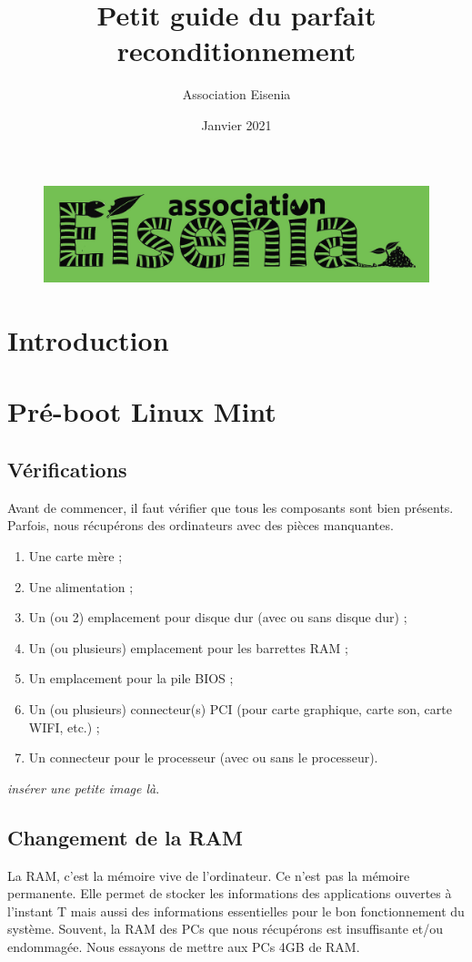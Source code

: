 \documentclass[12pt]{article}
\title{Petit guide du parfait reconditionnement}
\author{Association Eisenia}
\date{Janvier 2021}
\begin{document}
\maketitle
\begin{figure}
\centering\includegraphics[scale=0.5]{include/logo.jpg}
\end{figure}

\newpage
\renewcommand{\contentsname}{Table des matières}
\tableofcontents

\newpage
\section{Introduction}

\section{Pré-boot Linux Mint}
    \subsection{Vérifications}
        Avant de commencer, il faut vérifier que tous les composants sont bien présents.
        Parfois, nous récupérons des ordinateurs avec des pièces manquantes.
        \begin{enumerate}
            \item Une carte mère ;
            \item Une alimentation ;
            \item Un (ou 2) emplacement pour disque dur (avec ou sans disque dur) ;
            \item Un (ou plusieurs) emplacement pour les barrettes RAM ;
            \item Un emplacement pour la pile BIOS ;
            \item Un (ou plusieurs) connecteur(s) PCI (pour carte graphique, carte son, carte WIFI, etc.) ;
            \item Un connecteur pour le processeur (avec ou sans le processeur).
        \end{enumerate}
        \textit{insérer une petite image là}.
    \subsection{Changement de la RAM}
        La RAM, c'est la mémoire vive de l'ordinateur. Ce n'est pas la mémoire permanente. Elle permet de stocker les informations des applications ouvertes à l'instant T mais aussi des informations essentielles pour le bon fonctionnement du système.\newline
        Souvent, la RAM des PCs que nous récupérons est insuffisante et/ou endommagée. Nous essayons de mettre aux PCs 4GB de RAM.
\end{document}
